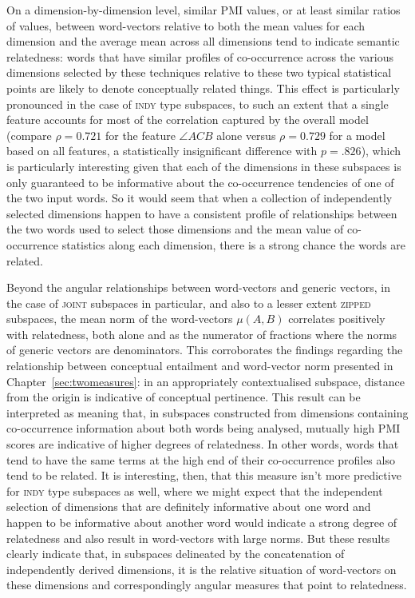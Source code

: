 On a dimension-by-dimension level, similar PMI values, or at least similar ratios of values, between word-vectors relative to both the mean values for each dimension and the average mean across all dimensions tend to indicate semantic relatedness: words that have similar profiles of co-occurrence across the various dimensions selected by these techniques relative to these two typical statistical points are likely to denote conceptually related things.  This effect is particularly pronounced in the case of \textsc{indy} type subspaces, to such an extent that a single feature accounts for most of the correlation captured by the overall model (compare $\rho = 0.721$ for the feature $\angle ACB$ alone versus $\rho = 0.729$ for a model based on all features, a statistically insignificant difference with $p = .826$), which is particularly interesting given that each of the dimensions in these subspaces is only guaranteed to be informative about the co-occurrence tendencies of one of the two input words.  So it would seem that when a collection of independently selected dimensions happen to have a consistent profile of relationships between the two words used to select those dimensions and the mean value of co-occurrence statistics along each dimension, there is a strong chance the words are related.

Beyond the angular relationships between word-vectors and generic vectors, in the case of \textsc{joint} subspaces in particular, and also to a lesser extent \textsc{zipped} subspaces, the mean norm of the word-vectors $\mu(A,B)$ correlates positively with relatedness, both alone and as the numerator of fractions where the norms of generic vectors are denominators.  This corroborates the findings regarding the relationship between conceptual entailment and word-vector norm presented in Chapter~\ref{sec:twomeasures}: in an appropriately contextualised subspace, distance from the origin is indicative of conceptual pertinence.  This result can be interpreted as meaning that, in subspaces constructed from dimensions containing co-occurrence information about both words being analysed, mutually high PMI scores are indicative of higher degrees of relatedness.  In other words, words that tend to have the same terms at the high end of their co-occurrence profiles also tend to be related.  It is interesting, then, that this measure isn't more predictive for \textsc{indy} type subspaces as well, where we might expect that the independent selection of dimensions that are definitely informative about one word and happen to be informative about another word would indicate a strong degree of relatedness and also result in word-vectors with large norms.  But these results clearly indicate that, in subspaces delineated by the concatenation of independently derived dimensions, it is the relative situation of word-vectors on these dimensions and correspondingly angular measures that point to relatedness.

